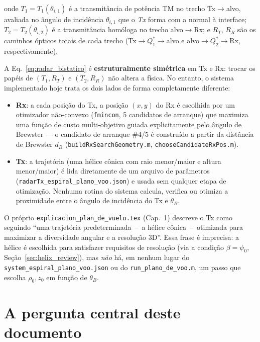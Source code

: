 \documentclass[12pt,a4paper,oneside]{book}
\newcommand{\nota}[2]{%
  \begin{tcolorbox}[enhanced, breakable,
    colback=green!5, colframe=green!50!black,
    fonttitle=\bfseries\small,
    title={\protect#1}]
    #2
  \end{tcolorbox}}
\theoremstyle{definition}
\theoremstyle{remark}
\newcommand{\RT}{R_T}
\newcommand{\RR}{R_R}
\newcommand{\thetaB}{\theta_B}
\begin{document}
onde $T_1=T_1(\theta_{i,1})$ é a transmitância de potência TM no trecho
Tx$\to$alvo, avaliada no ângulo de incidência $\theta_{i,1}$ que o \emph{Tx}
forma com a normal à interface; $T_2=T_2(\theta_{i,2})$ é a transmitância
homóloga no trecho alvo$\to$Rx; e $\RT$, $\RR$ são os caminhos ópticos totais
de cada trecho (Tx$\to Q_1^*\to$alvo e alvo$\to Q_2^*\to$Rx,
respectivamente).

A Eq.~\eqref{eq:radar_bistatico} é \textbf{estruturalmente simétrica} em Tx e
Rx: trocar os papéis de $(T_1,\RT)$ e $(T_2,\RR)$ não altera a física. No
entanto, o sistema implementado hoje trata os dois lados de forma
completamente diferente:

\begin{itemize}
  \item \textbf{Rx}: a cada posição do Tx, a posição $(x,y)$ do Rx é
  escolhida por um otimizador não-convexo (\texttt{fmincon}, 5 candidatos de
  arranque) que maximiza uma função de custo multi-objetivo guiada
  explicitamente pelo ângulo de Brewster — o candidato de arranque \#4/5
  é construído a partir da distância de Brewster $d_B$
  (\texttt{buildRxSearchGeometry.m}, \texttt{chooseCandidateRxPos.m}).

  \item \textbf{Tx}: a trajetória (uma hélice cônica com raio menor/maior e
  altura menor/maior) é lida diretamente de um arquivo de parâmetros
  (\texttt{radarTx\_espiral\_plano\_voo.json}) e usada sem qualquer etapa de
  otimização. Nenhuma rotina do sistema calcula, verifica ou otimiza a
  proximidade entre o ângulo de incidência do Tx e $\thetaB$.
\end{itemize}

\nota{Evidência direta no código}{
O próprio \texttt{explicacion\_plan\_de\_vuelo.tex} (Cap.~1) descreve o Tx
como seguindo ``uma trajetória predeterminada \,--\, a hélice cônica \,--\,
otimizada para maximizar a diversidade angular e a resolução 3D''. Essa
frase é imprecisa: a hélice é escolhida para satisfazer requisitos de
resolução (via a condição $\beta=\psi_0$, Seção~\ref{sec:helix_review}),
mas \emph{não} há, em nenhum lugar do \texttt{system\_espiral\_plano\_voo.json}
ou do \texttt{run\_plano\_de\_voo.m}, um passo que escolha $\rho_0,z_0$ em
função de $\thetaB$.
}

\section{A pergunta central deste documento}
\end{document}
